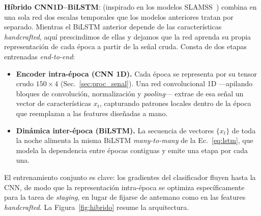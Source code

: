 \documentclass[conference]{IEEEtran}
\begin{document}
\textbf{Híbrido CNN1D--BiLSTM}: (inspirado en los modelos SLAMSS~\cite{SLAMSS2023}) combina en una sola red dos escalas temporales que los modelos anteriores tratan por separado. Mientras el BiLSTM anterior depende de las características \emph{handcrafted}, aquí prescindimos de ellas y dejamos que la red aprenda su propia representación de cada época a partir de la señal cruda. Consta de dos etapas entrenadas \emph{end-to-end}:
\begin{itemize}
    \item \textbf{Encoder intra-época (CNN 1D).} Cada época se representa por su tensor crudo $150\times4$ (Sec.~\ref{sec:proc_senal}). Una red convolucional 1D ---apilando bloques de convolución, normalización y \emph{pooling}--- extrae de esa señal un vector de características $x_t$, capturando patrones locales dentro de la época que reemplazan a las features diseñadas a mano.
    \item \textbf{Dinámica inter-época (BiLSTM).} La secuencia de vectores $\{x_t\}$ de toda la noche alimenta la misma BiLSTM \emph{many-to-many} de la Ec.~\eqref{eq:lstm}, que modela la dependencia entre épocas contiguas y emite una etapa por cada una.
\end{itemize}
El entrenamiento conjunto es clave: los gradientes del clasificador fluyen hasta la CNN, de modo que la representación intra-época se optimiza específicamente para la tarea de \emph{staging}, en lugar de fijarse de antemano como en las features \emph{handcrafted}. La Figura~\ref{fig:hibrido} resume la arquitectura.
\end{document}
